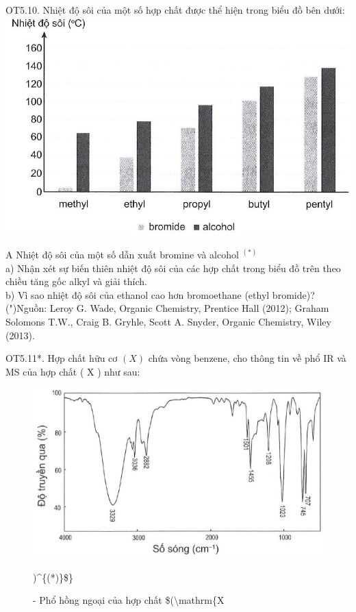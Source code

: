 \documentclass[10pt]{article}
\begin{document}
OT5.10. Nhiệt độ sôi của một số hợp chất được thể hiện trong biểu đồ bên dưới:\\
\includegraphics[max width=\textwidth, center]{2025_10_23_ae7aef68fb3b41082d29g-42}

A Nhiệt độ sôi của một số dẫn xuất bromine và alcohol ${ }^{(*)}$\\
a) Nhận xét sự biến thiên nhiệt độ sôi của các hợp chất trong biểu đồ trên theo chiều tăng gốc alkyl và giải thích.\\
b) Vì sao nhiệt độ sôi của ethanol cao hơn bromoethane (ethyl bromide)?\\
(")Nguồn: Leroy G. Wade, Organic Chemistry, Prentice Hall (2012); Graham Solomons T.W., Craig B. Gryhle, Scott A. Snyder, Organic Chemistry, Wiley (2013).

OT5.11*. Hợp chất hữu cơ $(X)$ chứa vòng benzene, cho thông tin về phổ IR và MS của hợp chất ( X ) như sau:

\begin{figure}[h]
\begin{center}
  \includegraphics[width=\textwidth]{2025_10_23_ae7aef68fb3b41082d29g-43}
\captionsetup{labelformat=empty}
\caption{- Phổ hồng ngoại của hợp chất \$(\textbackslash mathrm\{X})\^{}\{(*)\}\$\}\end{center}
\end{figure}
\end{document}
